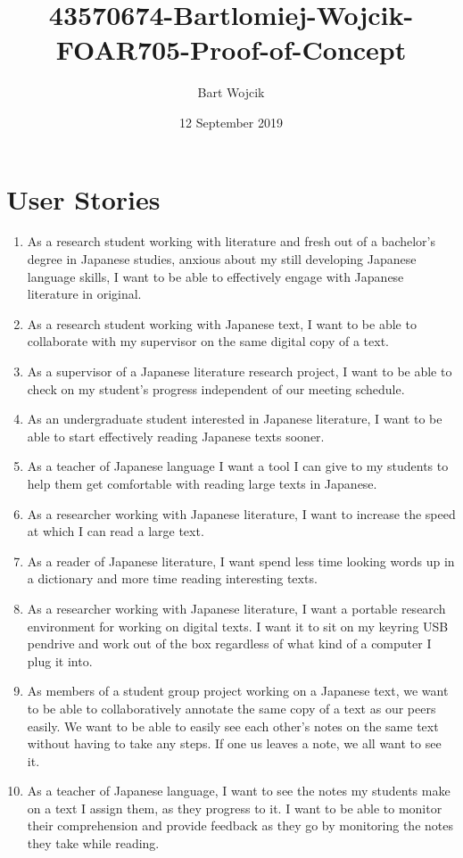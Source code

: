 \documentclass{article}
\title{43570674-Bartlomiej-Wojcik-FOAR705-Proof-of-Concept}
\author{Bart Wojcik}
\date{12 September 2019}
\begin{document}
\maketitle

\section{User Stories}
\begin{enumerate}
    \item As a research student working with literature and fresh out of a bachelor's degree in Japanese studies, anxious about my still developing Japanese language skills, I want to be able to effectively engage with Japanese literature in original.
    \item As a research student working with Japanese text, I want to be able to collaborate with my supervisor on the same digital copy of a text.
    \item As a supervisor of a Japanese literature research project, I want to be able to check on my student's progress independent of our meeting schedule.
    \item As an undergraduate student interested in Japanese literature, I want to be able to start effectively reading Japanese texts sooner.
    \item As a teacher of Japanese language I want a tool I can give to my students to help them get comfortable with reading large texts in Japanese.
    \item As a researcher working with Japanese literature, I want to increase the speed at which I can read a large  text.
    \item As a reader of Japanese literature, I want spend less time looking words up in a dictionary and more time reading interesting texts.
    \item As a researcher working with Japanese literature, I want a portable research environment for working on digital texts. I want it to sit on my keyring USB pendrive and work out of the box regardless of what kind of a computer I plug it into.
    \item As members of a student group project working on a Japanese text, we want to be able to collaboratively annotate the same copy of a text as our peers easily. We want to be able to easily see each other's notes on the same text without having to take any steps. If one us leaves a note, we all want to see it.
    \item As a teacher of Japanese language, I want to see the notes my students make on a text I assign them, as they progress to it. I want to be able to monitor their comprehension and provide feedback as they go by monitoring the notes they take while reading.
\end{enumerate}
\end{document}
